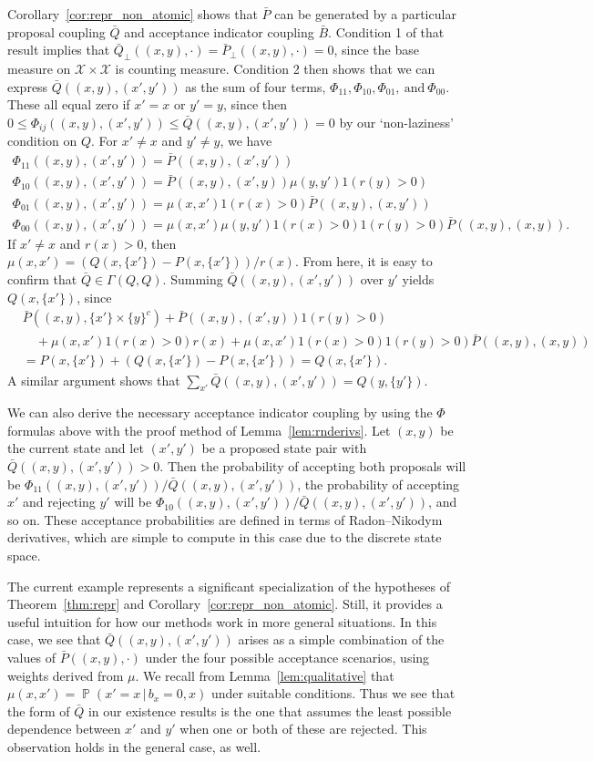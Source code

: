 \documentclass[aihp]{imsart}
\theoremstyle{plain}
\theoremstyle{remark}
\theoremstyle{definition} \newtheorem{example}{Example}
\newcommand{\eq}[1]{\begin{align*}#1\end{align*}} %
\newcommand{\ec}[1]{\begin{gather*}#1\end{gather*}} %
\renewcommand{\P}{\operatorname{\mathbb{P}}}
\newcommand{\calX}{\mathcal{X}}
\newcommand{\g}{\, | \,}
\newcommand{\sas}{\ \text{and} \ }
\newcommand{\bp}{\bar P}
\newcommand{\bq}{\bar Q}
\newcommand{\bb}{\bar B}
\newcommand{\sy}{\{ y \}}
\newcommand{\xy}{(x,y)}
\newcommand{\xyp}{(x',y')}
\begin{document}
Corollary~\ref{cor:repr_non_atomic} shows that $\bp$ can be generated by a particular proposal
coupling $\bq$ and acceptance indicator coupling $\bb$. Condition 1 of that result implies that
$\bq_\perp(\xy, \cdot) = \bp_\perp(\xy, \cdot) = 0$, since the base measure on $\calX \times \calX$
is counting measure. Condition 2 then shows that we can express $\bq(\xy, \xyp)$ as the sum of four
terms, $\Phi_{11}, \Phi_{10}, \Phi_{01}, \sas \Phi_{00}$. These all equal zero if $x' = x$ or $y' =
y$, since then $0 \leq \Phi_{ij}(\xy, \xyp) \leq \bq(\xy, \xyp) = 0$ by our `non-laziness' condition
on $Q$. For $x' \neq x$ and $y' \neq y$, we have
\ec{
	\Phi_{11}(\xy, \xyp) = \bp(\xy, \xyp) \\
	\Phi_{10}(\xy, \xyp) = \bp(\xy, (x', y)) \mu(y, y') 1(r(y) > 0) \\
	\Phi_{01}(\xy, \xyp)  =  \mu(x, x') 1(r(x) > 0) \bp(\xy, (x, y')) \\
	\Phi_{00}(\xy, \xyp) =  \mu(x, x') \mu(y, y') 1(r(x) > 0) 1(r(y) > 0) \bp(\xy, \xy).
}
If $x' \neq x$ and $r(x) > 0$, then $\mu(x, x') = (Q(x, \{x'\}) - P(x, \{x'\}))/r(x)$.
From here, it is easy to confirm that ${\bq \in \Gamma(Q,Q)}$.
Summing $\bq(\xy, \xyp)$ over $y'$ yields $Q(x, \{x'\})$, since
\eq{
	& \bp(\xy, \{x'\} \times \sy^c) + \bp(\xy, (x', y)) 1(r(y) > 0) \\
	& \quad + \mu(x, x') 1(r(x) > 0) r(x) + \mu(x, x') 1(r(x) > 0) 1(r(y) > 0) \bp(\xy, \xy) \\
	& = P(x, \{ x' \}) + (Q(x, \{x'\}) - P(x, \{x'\})) = Q(x, \{x'\}).
}
A similar argument shows that $\sum_{x'} \bq(\xy, \xyp) = Q(y, \{y'\})$.

We can also derive the necessary acceptance indicator coupling by using the $\Phi$ formulas above
with the proof method of Lemma~\ref{lem:rnderivs}. Let $\xy$ be the current state and let $\xyp$ be
a proposed state pair with $\bq(\xy, \xyp) >0$. Then the probability of accepting both proposals
will be $\Phi_{11}(\xy,\xyp) / \bq(\xy, \xyp)$, the probability of accepting $x'$ and rejecting $y'$
will be $\Phi_{10}(\xy,\xyp) / \bq(\xy, \xyp)$, and so on. These acceptance probabilities are
defined in terms of Radon--Nikodym derivatives, which are simple to compute in this case due to the
discrete state space.

The current example represents a significant specialization of the hypotheses of
Theorem~\ref{thm:repr} and Corollary~\ref{cor:repr_non_atomic}. Still, it provides a useful
intuition for how our methods work in more general situations. In this case, we see that
$\bq(\xy, \xyp)$ arises as a simple combination of the values of $\bp(\xy, \cdot)$ under the four
possible acceptance scenarios, using weights derived from $\mu$. We recall from
Lemma~\ref{lem:qualitative} that $\mu(x,x') = \P(x' = x \g b_x = 0, x)$ under suitable conditions.
Thus we see that the form of $\bq$ in our existence results is the one that assumes the least
possible dependence between $x'$ and $y'$ when one or both of these are rejected. This observation
holds in the general case, as well.
\end{document}
